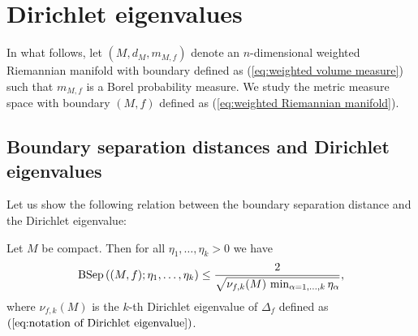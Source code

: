 \section{Dirichlet eigenvalues}\label{sec:Dirichlet eigenvalues}
In what follows,
let $(M,d_{M},m_{M,f})$ denote an $n$-dimensional weighted Riemannian manifold with boundary defined as (\ref{eq:weighted volume measure}) such that $m_{M,f}$ is a Borel probability measure.
We study the metric measure space with boundary $(M,f)$ defined as (\ref{eq:weighted Riemannian manifold}).

\subsection{Boundary separation distances and Dirichlet eigenvalues}
Let us show the following relation between the boundary separation distance and the Dirichlet eigenvalue:
\begin{lem}\label{lem:Dirichlet eigenvalue and Dirichlet separation distance}
Let $M$ be compact.
Then for all $\eta_{1},\dots,\eta_{k}>0$
we have
\begin{equation*}
\operatorname{BSep}\left((M,f);\eta_{1},\dots,\eta_{k}\right)\leq \frac{2}{\sqrt{\nu_{f,k}(M)\, \min_{\alpha=1,\dots,k} \eta_{\alpha}}},
\end{equation*}
where $\nu_{f,k}(M)$ is the $k$-th Dirichlet eigenvalue of $\Delta_{f}$ defined as $(\ref{eq:notation of Dirichlet eigenvalue})$.
\end{lem}
